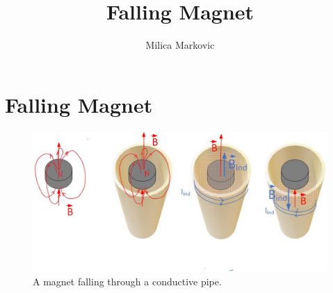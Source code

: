 \documentclass{ximera}
\title{Falling Magnet}
\author{Milica Markovic}
\begin{document}
  
\begin{abstract}  

\end{abstract}  
\maketitle    


\section{Falling Magnet}






\begin{figure}[htbp]
\begin{center}
\includegraphics[scale=0.5]{../jpg/fallingMagnet.jpg}
\end{center}
\caption{A magnet falling through a conductive pipe.}
\label{inducedemf}
\end{figure}
\end{document}

